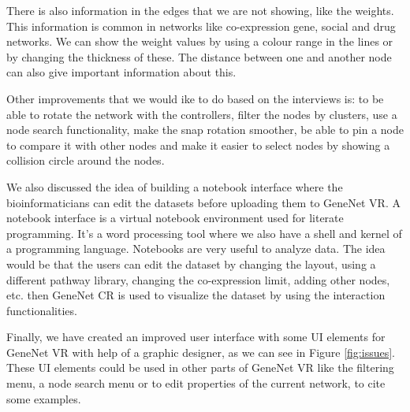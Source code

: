 There is also information in the edges that we are not showing, like the weights. This information is common in networks like co-expression gene, social and drug networks. We can show the weight values by using a colour range in the lines or by changing the thickness of these. The distance between one and another node can also give important information about this.

Other improvements that we would ike to do based on the interviews is: to be able to rotate the network with the controllers, filter the nodes by clusters, use a node search functionality, make the snap rotation smoother, be able to pin a node to compare it with other nodes and make it easier to select nodes by showing a collision circle around the nodes.

We also discussed the idea of building a notebook interface where the bioinformaticians can edit the datasets before uploading them to GeneNet VR. A notebook interface is a virtual notebook environment used for literate programming. It's a word processing tool where we also have a shell and kernel of a programming language. Notebooks are very useful to analyze data. The idea would be that the users can edit the dataset by changing the layout, using a different pathway library, changing the co-expression limit, adding other nodes, etc. then GeneNet CR is used to visualize the dataset by using the interaction functionalities.

Finally, we have created an improved user interface with some UI elements for GeneNet VR with help of a graphic designer, as we can see in Figure \ref{fig:issues}. These UI elements could be used in other parts of GeneNet VR like the filtering menu, a node search menu or to edit properties of the current network, to cite some examples.
